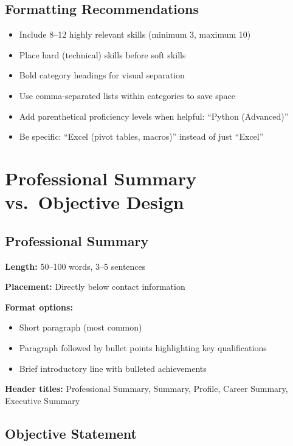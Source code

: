 \documentclass[11pt,a4paper]{article}
\begin{document}
\subsection{Formatting Recommendations}

\begin{bestpractice}
\begin{itemize}[noitemsep]
    \item Include 8--12 highly relevant skills (minimum 3, maximum 10)
    \item Place hard (technical) skills before soft skills
    \item Bold category headings for visual separation
    \item Use comma-separated lists within categories to save space
    \item Add parenthetical proficiency levels when helpful: ``Python (Advanced)''
    \item Be specific: ``Excel (pivot tables, macros)'' instead of just ``Excel''
\end{itemize}
\end{bestpractice}

\section{Professional Summary vs.\ Objective Design}

\subsection{Professional Summary}

\textbf{Length:} 50--100 words, 3--5 sentences

\textbf{Placement:} Directly below contact information

\textbf{Format options:}
\begin{itemize}
    \item Short paragraph (most common)
    \item Paragraph followed by bullet points highlighting key qualifications
    \item Brief introductory line with bulleted achievements
\end{itemize}

\textbf{Header titles:} Professional Summary, Summary, Profile, Career Summary, Executive Summary

\subsection{Objective Statement}
\end{document}

